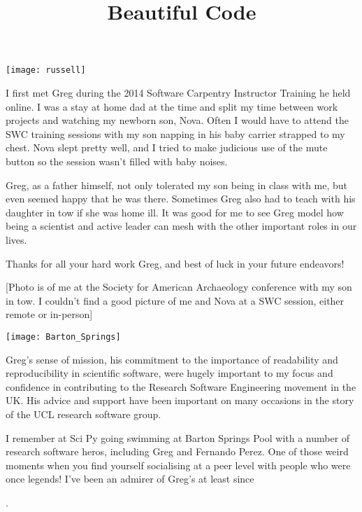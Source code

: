 
\newpage
\begin{minipage}{0.45\textwidth}
    \texttt{[image: russell]}
\end{minipage}
\hfill
\begin{minipage}{0.45\textwidth}
\setlength{\parindent}{0in}
\setlength{\parskip}{1em}
I first met Greg during the 2014 Software Carpentry Instructor Training he held
online. I was a stay at home dad at the time and split my time between work
projects and watching my newborn son, Nova. Often I would have to attend
the SWC training sessions with my son napping in his baby carrier strapped
to my chest. Nova slept pretty well, and I tried to make judicious use of
the mute button so the session wasn't filled with baby noises. 

Greg, as a father himself, not only tolerated my son being in class with
me, but even seemed happy that he was there. Sometimes Greg also had to
teach with his daughter in tow if she was home ill. It was good for me to
see Greg model how being a scientist and active leader can mesh with the
other important roles in our lives. 

Thanks for all your hard work Greg, and best of luck in your future endeavors! 

[Photo is of me at the Society for American Archaeology conference with my son
in tow. I couldn't find a good picture of me and Nova at a SWC session, either
remote or in-person]

\end{minipage}

\newpage

\texttt{[image: Barton\_Springs]}

Greg's sense of mission, his commitment to the importance of readability and
reproducibility in scientific software, were hugely important to my focus and
confidence in contributing to the Research Software Engineering movement in the
UK. His advice and support have been important on many occasions in the story
of the UCL research software group.

I remember at Sci Py going swimming at Barton Springs Pool with a number of
research software heros, including Greg and Fernando Perez. One of those weird
moments when you find yourself socialising at a peer level with people who were
once legends! I've been an admirer of Greg's at least since \title{Beautiful
Code}.


